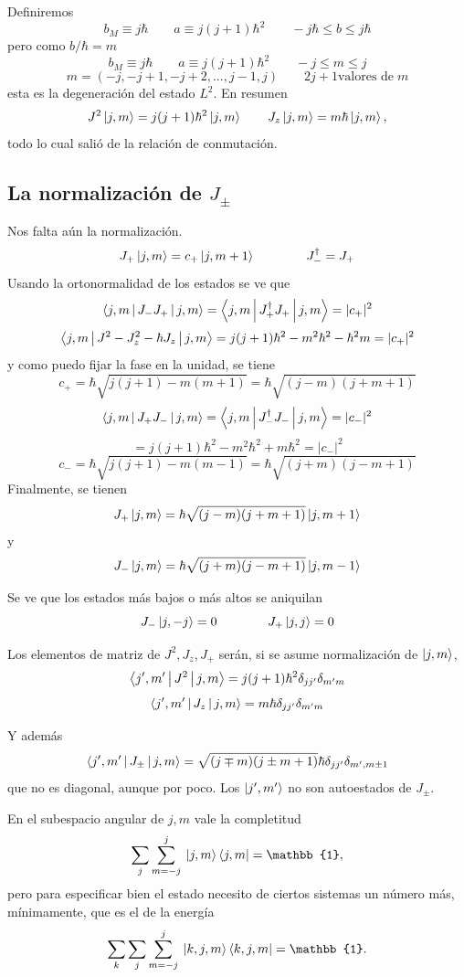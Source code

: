 \documentclass[10pt,oneside]{CBFT_book}
\begin{document}
Definiremos 
\[
	b_M \equiv j \hbar \qquad a \equiv j (j+1) \hbar^2 \qquad -j\hbar \leq b \leq j\hbar
\]
pero como $b/\hbar = m$
\[
	b_M \equiv j \hbar \qquad a \equiv j (j+1) \hbar^2 \qquad -j \leq m \leq j
\]
\[
	m = (-j,-j+1,-j+2,...,j-1,j) \qquad 2j+1 \text{valores de} \; m
\]
esta es la degeneración del estado $L^2$. En resumen
\[
	J^2 \Ket{j,m} = j( j+1 )\hbar^2\Ket{j,m} \qquad J_z \Ket{j,m} = m \hbar \Ket{j,m},
\]
todo lo cual salió de la relación de conmutación.

\subsection{La normalización de $J_\pm$}

Nos falta aún la normalización.
\[
	J_+\Ket{j,m} = c_+ \Ket{j,m+1} \qquad \qquad J_-^\dagger = J_+
\]
Usando la ortonormalidad de los estados se ve que
\[
	\Braket{j,m|J_-J_+|j,m} = \Braket{j,m|J_+^\dagger J_+|j,m} = |c_+|^2
\]
\[
	\Braket{j,m|J^2 - J_z^2 - \hbar J_z|j,m} = j(j+1)\hbar^2 - m^2\hbar^2 -\hbar^2 m = |c_+|^2
\]
y como puedo fijar la fase en la unidad, se tiene
\[
	c_+ = \hbar\sqrt{j(j+1)-m(m+1)} = \hbar \sqrt{(j-m)(j+m+1)}
\]
\[
	\Braket{j,m|J_+J_-|j,m} = \Braket{j,m|J_-^\dagger J_-|j,m} = |c_-|^2
\]
\[
	= j(j+1)\hbar^2 - m^2\hbar^2 + m\hbar^2 = |c_-|^2
\]
\[
	c_- = \hbar\sqrt{j(j+1)-m(m-1)} = \hbar \sqrt{(j+m)(j-m+1)}
\]
Finalmente, se tienen
\[
	J_+ \Ket{j,m} = \hbar \sqrt{(j-m)(j+m+1)}\Ket{j,m+1}
\]
y
\[
	J_- \Ket{j,m} = \hbar \sqrt{(j+m)(j-m+1)}\Ket{j,m-1} 
\]

Se ve que los estados más bajos o más altos se aniquilan
\[
	J_- \Ket{j,-j} = 0 \qquad \qquad J_+ \Ket{j,j} = 0
\]

Los elementos de matriz de $J^2, J_z, J_+$ serán, si se asume normalización de $\Ket{j,m}$, 
\[
	\Braket{j',m'|J^2|j,m} = j(j+1)\hbar^2 \delta_{jj'} \delta_{m' m}
\]
\[
	\Braket{j',m'|J_z|j,m} = m \hbar \delta_{jj'} \delta_{m' m}
\]

Y además
\[
	\Braket{j',m'|J_\pm|j,m} = \sqrt{(j\mp m)(j \pm m +1)} \hbar \delta_{jj'} \delta_{m',m \pm 1}
\]
que no es diagonal, aunque por poco. Los $\Ket{j',m'}$ no son autoestados de $J_\pm$.

En el subespacio angular de $j,m$ vale la completitud
\[
	\sum_j \sum_{m=-j}^j \: \KB{j,m}{j,m} = \mathbb{1},
\]
pero para especificar bien el estado necesito de ciertos sistemas un número más, mínimamente, que
es el de la energía
\[
	\sum_k \sum_j \sum_{m=-j}^j \: \KB{k,j,m}{k,j,m} = \mathbb{1}.
\]
\end{document}
